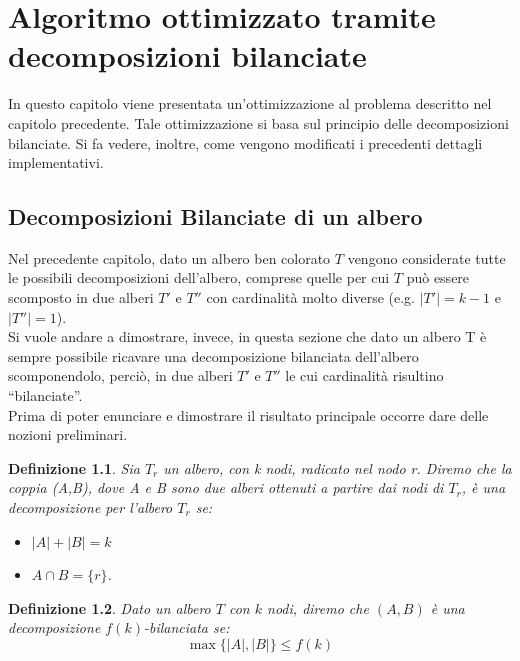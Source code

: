 \chapter{Algoritmo ottimizzato tramite decomposizioni bilanciate}
\label{cap:3}
In questo capitolo viene presentata un'ottimizzazione al problema descritto nel capitolo precedente.
Tale ottimizzazione si basa sul principio delle decomposizioni bilanciate.
Si fa vedere, inoltre, come vengono modificati i precedenti dettagli implementativi.

\section{Decomposizioni Bilanciate di un albero}
\label{cap:3 par:1}
Nel precedente capitolo, dato un albero ben colorato $ T $ vengono considerate tutte le possibili decomposizioni dell'albero, comprese quelle per cui $ T $ pu\`o essere scomposto in due alberi $ T' $ e $ T'' $ con cardinalit\`a molto diverse (e.g. $ |T'|=k-1 $ e $ |T''| = 1 $).\\ 
Si vuole andare a dimostrare, invece, in questa sezione che dato un albero T \`e sempre possibile ricavare una decomposizione bilanciata dell'albero scomponendolo, perci\`o,  in due alberi $ T' $ e $ T'' $ le cui cardinalit\`a risultino ``bilanciate''.
\\
Prima di poter enunciare e dimostrare il risultato principale occorre dare delle nozioni preliminari.

\newtheorem{definizione}{Definizione}[section]

\begin{definizione}
	\label{definizioneDeco} 
Sia $T_r$ un albero, con k nodi, radicato nel nodo r.
Diremo che la coppia (A,B), dove  A e B sono due alberi ottenuti a partire dai nodi di $T_r$, \`e una decomposizione per l'albero $ T_r $ se:
\begin{itemize}
	\item $| A | + | B | = k$
	\item $A \cap B = \{r\}$.
\end{itemize}
\end{definizione}


\begin{definizione}
\label{lemmaDeco}
Dato un albero $ T $ con $ k $ nodi, diremo che $ (A,B) $ \`e una decomposizione $ f(k) $-bilanciata se:
\begin{equation*}
	\max{ \{|A| , |B| \} }  \le  f(k)
\end{equation*}
\end{definizione}





